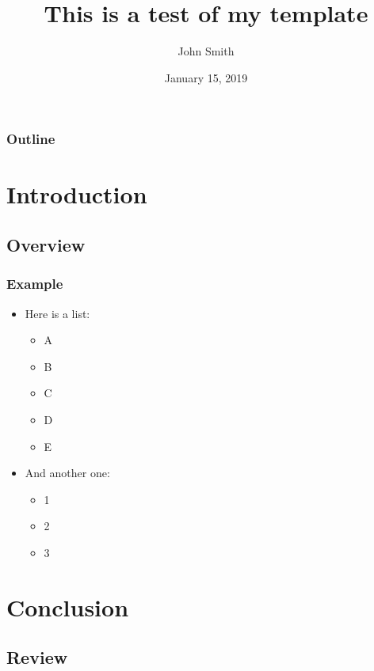 \documentclass{beamer}
\title[Test]{
This is a test of my template
}
\author[J.~Smith]{John Smith}
\institute[A]{Affiliation}
\date[Jan. 15, 2019]{January 15, 2019}
\begin{document}

\begin{frame}[plain]
\titlepage
\end{frame}

\begin{frame}
    \frametitle{Outline}
    \begin{multicols}{2}
        \tableofcontents
    \end{multicols}
\end{frame}


\section{Introduction}
\subsection{Overview}

\begin{frame}
\frametitle{Example}
\begin{itemize}
    \item Here is a list:
    \begin{itemize}
        \item A
        \item B
        \item C
        \item D
        \item E
    \end{itemize}
    \item And another one:
    \begin{itemize}
        \item 1
        \item 2
        \item 3
    \end{itemize}
\end{itemize}
\end{frame}

\section{Conclusion}
\subsection{Review}
\end{document}
